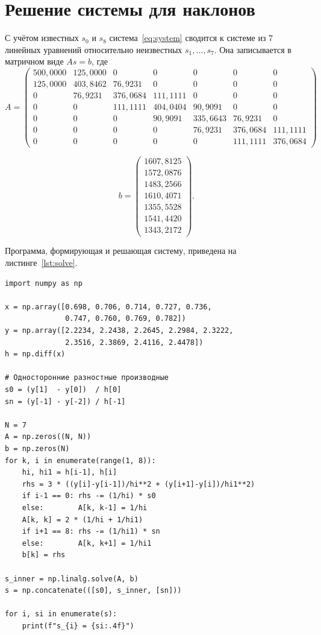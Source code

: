 \documentclass[a4paper, final]{article}
\begin{document}
\newpage

\section{Решение системы для наклонов}

С учётом известных $s_0$ и $s_8$ система~\eqref{eq:system} сводится к системе
из 7 линейных уравнений относительно неизвестных $s_1, \ldots, s_7$. Она
записывается в матричном виде $As = b$, где
\[
A = \begin{pmatrix}
500{,}0000 & 125{,}0000 & 0 & 0 & 0 & 0 & 0 \\
125{,}0000 & 403{,}8462 & 76{,}9231 & 0 & 0 & 0 & 0 \\
0 & 76{,}9231 & 376{,}0684 & 111{,}1111 & 0 & 0 & 0 \\
0 & 0 & 111{,}1111 & 404{,}0404 & 90{,}9091 & 0 & 0 \\
0 & 0 & 0 & 90{,}9091 & 335{,}6643 & 76{,}9231 & 0 \\
0 & 0 & 0 & 0 & 76{,}9231 & 376{,}0684 & 111{,}1111 \\
0 & 0 & 0 & 0 & 0 & 111{,}1111 & 376{,}0684
\end{pmatrix}\!
\]

\[b = \begin{pmatrix}
1607{,}8125 \\ 1572{,}0876 \\ 1483{,}2566 \\ 1610{,}4071 \\ 1355{,}5528 \\ 1541{,}4420 \\ 1343{,}2172
\end{pmatrix}\!.\]

Программа, формирующая и решающая систему, приведена на
листинге~\ref{lst:solve}.

\begin{lstlisting}[caption={Формирование и решение системы для наклонов}, label=lst:solve]
import numpy as np

x = np.array([0.698, 0.706, 0.714, 0.727, 0.736,
              0.747, 0.760, 0.769, 0.782])
y = np.array([2.2234, 2.2438, 2.2645, 2.2984, 2.3222,
              2.3516, 2.3869, 2.4116, 2.4478])
h = np.diff(x)

# Односторонние разностные производные
s0 = (y[1]  - y[0])  / h[0]
sn = (y[-1] - y[-2]) / h[-1]

N = 7
A = np.zeros((N, N))
b = np.zeros(N)
for k, i in enumerate(range(1, 8)):
    hi, hi1 = h[i-1], h[i]
    rhs = 3 * ((y[i]-y[i-1])/hi**2 + (y[i+1]-y[i])/hi1**2)
    if i-1 == 0: rhs -= (1/hi) * s0
    else:        A[k, k-1] = 1/hi
    A[k, k] = 2 * (1/hi + 1/hi1)
    if i+1 == 8: rhs -= (1/hi1) * sn
    else:        A[k, k+1] = 1/hi1
    b[k] = rhs

s_inner = np.linalg.solve(A, b)
s = np.concatenate(([s0], s_inner, [sn]))

for i, si in enumerate(s):
    print(f"s_{i} = {si:.4f}")
\end{lstlisting}
\end{document}
